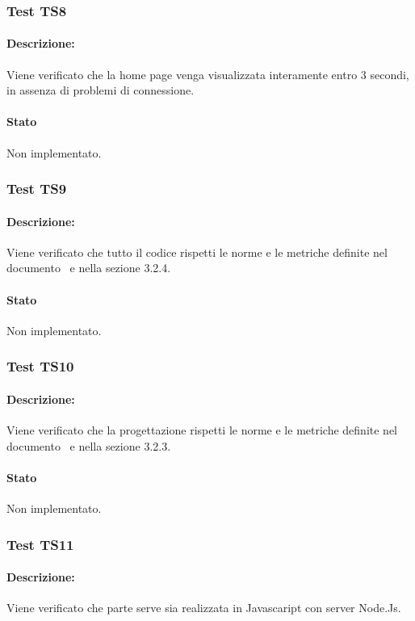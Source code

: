 \documentclass[../PianoDiQualifica.tex]{subfiles}
\begin{document}
	\subsubsection{Test TS8} 
	\paragraph{Descrizione:} Viene verificato che la home page venga visualizzata interamente entro 3 secondi, in assenza di problemi di connessione.
	\paragraph{Stato} Non implementato.
	
	\subsubsection{Test TS9} 
	\paragraph{Descrizione:} Viene verificato che tutto il codice rispetti
	le norme e le metriche definite nel documento \normediprogetto\ e nella
	sezione 3.2.4.
	\paragraph{Stato} Non implementato.
	
	\subsubsection{Test TS10} 
	\paragraph{Descrizione:} Viene verificato che la progettazione rispetti
	le norme e le metriche definite nel documento \normediprogettov\ e nella
	sezione 3.2.3.
	\paragraph{Stato} Non implementato.
	
	
	\subsubsection{Test TS11} 
	\paragraph{Descrizione:} Viene verificato che parte serve sia realizzata in Javascaript con server Node.Js.
\end{document}
